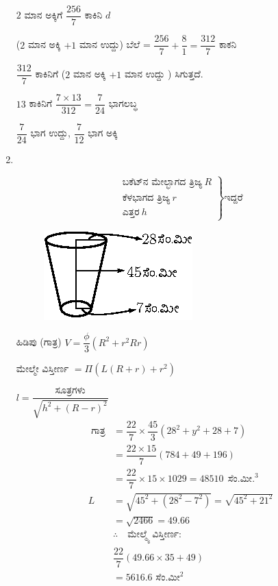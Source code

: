 \begin{enumerate}
\vskip 0.3cm

$2$ ಮಾನ ಅಕ್ಕಿಗೆ $\dfrac{256}{7}$ ಕಾಕಿನಿ $d$

($2$ ಮಾನ ಅಕ್ಕಿ $+ 1$ ಮಾನ ಉದ್ದು) ಬೆಲೆ = $\dfrac{256}{7} + \dfrac{8}{1} = \dfrac{312}{7}$ ಕಾಕನಿ 

$\dfrac{312}{7}$ ಕಾಕಿನಿಗೆ ($2$ ಮಾನ ಅಕ್ಕಿ $+ 1$ ಮಾನ ಉದ್ದು ) ಸಿಗುತ್ತದೆ. 

$13$ ಕಾಕಿನಿಗೆ  $\dfrac{7\times 13}{312} = \dfrac{7}{24}$ ಭಾಗಲಬ್ಧ 

$\dfrac{7}{24}$ ಭಾಗ ಉದ್ದು, $\dfrac{7}{12}$ ಭಾಗ ಅಕ್ಕಿ 

\smallskip

\item 
~

\begin{minipage}[c]{4cm}
\begin{equation*}
\left.
\begin{aligned}
\text{ಬಕೆಟ್‌ನ ಮೇಲ್ಭಾಗದ ತ್ರಿಜ್ಯ}  ~R \\
\text{ಕೆಳಭಾಗದ ತ್ರಿಜ್ಯ} ~r   \\
\text{ಎತ್ತರ} ~h  
\end{aligned}
\right\}
\text{ಇದ್ದರೆ}
\end{equation*}
\end{minipage}
\qquad
\begin{minipage}[c]{5cm}
\begin{figure}[H]
\centering
\includegraphics{images/chap10/ans23.eps}
\end{figure}
\end{minipage}

\smallskip

ಹಿಡಿಪು (ಗಾತ್ರ) $V = \dfrac{\phi}{3} (R^{2} + r^{2}  Rr)$

ಮೇಲ್ಮೇ ವಿಸ್ತೀರ್ಣ $= \Pi (L(R + r) + r^{2})$

${l = \dfrac{{\text{ ಸೂತ್ರಗಳು }}}{\sqrt{h^{2} + (R - r)^{2}}}}$
\begin{align*}
\text{ ಗಾತ್ರ} & = \dfrac{22}{7} \times \dfrac{45}{3} (28^{2} + y^{2} + 28 + 7)\\
& = \dfrac{22\times 15}{7} (784 + 49 + 196)\\
& = \dfrac{22}{7} \times 15\times 1029 = 48510 ~~\text{ಸೆಂ.ಮೀ.}^{3}\\
L & = \sqrt{45^{2} + (28^{2} - 7^{2})} = \sqrt{45^{2} + 21^{2}} \\
&= \sqrt{2466} = 49.66\\
& \therefore\quad \text{ಮೇಲ್ಮ್ಯೆ  ವಿಸ್ತೀರ್ಣ:}\\
& \dfrac{22}{7} (49.66\times 35 + 49) \\
& = 5616.6 \text{ ಸೆಂ.ಮೀ}^{2} 
\end{align*}


\end{enumerate}
